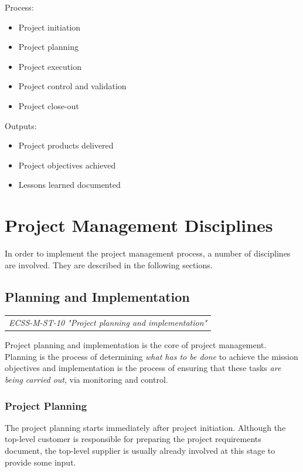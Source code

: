 Process:
\begin{itemize}
\item Project initiation
\item Project planning
\item Project execution
\item Project control and validation
\item Project close-out
\end{itemize}

Outputs:
\begin{itemize}
\item Project products delivered
\item Project objectives achieved 
\item Lessons learned documented
\end{itemize}

\section{Project Management Disciplines}

In order to implement the project management process, a number of disciplines are involved. They are described in the following sections.

\subsection{Planning and Implementation}

\begin{tabular}{l}
\textit{ECSS-M-ST-10 "Project planning and implementation" \cite{ECSS-M-ST-10}}
\end{tabular}

Project planning and implementation is the core of project management. Planning is the process of determining \emph{what has to be done} to achieve the mission objectives and implementation is the process of ensuring that these tasks \emph{are being carried out}, via monitoring and control.

\subsubsection{Project Planning}

The project planning starts immediately after project initiation. Although the top-level customer is responsible for preparing the project requirements document, the top-level supplier is usually already involved at this stage to provide some input.

